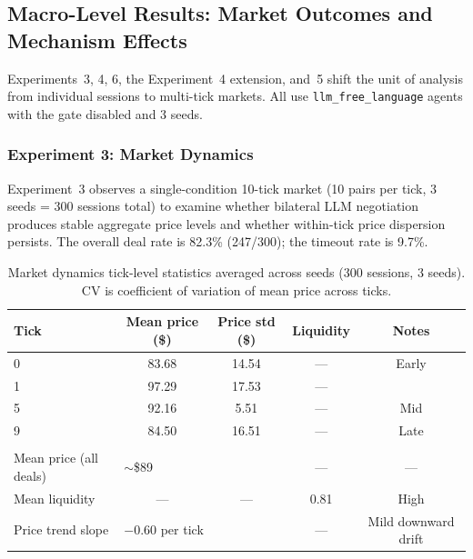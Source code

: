 \subsection{Macro-Level Results: Market Outcomes and Mechanism Effects}
\label{sec:results-macro}

Experiments~3, 4, 6, the Experiment~4 extension, and~5 shift the unit of analysis from individual sessions to multi-tick markets.  All use \texttt{llm\_free\_language} agents with the gate disabled and 3 seeds.

\subsubsection{Experiment 3: Market Dynamics}
\label{sec:results-market}

Experiment~3 observes a single-condition 10-tick market (10 pairs per tick, 3 seeds = 300 sessions total) to examine whether bilateral LLM negotiation produces stable aggregate price levels and whether within-tick price dispersion persists.  The overall deal rate is 82.3\% (247/300); the timeout rate is 9.7\%.

\begin{table}[ht]
\centering
\caption{Market dynamics tick-level statistics averaged across seeds (300 sessions, 3 seeds).  CV is coefficient of variation of mean price across ticks.}
\label{tab:market-agg}
\begin{tabular}{@{}lcccc@{}}
\toprule
Tick & Mean price (\$) & Price std (\$) & Liquidity & Notes \\
\midrule
0 & 83.68 & 14.54 & --- & Early \\
1 & 97.29 & 17.53 & --- & \\
5 & 92.16 & 5.51  & --- & Mid \\
9 & 84.50 & 16.51 & --- & Late \\
\addlinespace
\multicolumn{5}{@{}l}{\textit{Aggregate (all 10 ticks)}} \\
Mean price (all deals) & \multicolumn{2}{l}{$\sim$\$89} & --- & --- \\
Mean liquidity & --- & --- & 0.81 & High \\
Price trend slope & \multicolumn{2}{l}{$-$0.60 per tick} & --- & Mild downward drift \\
\bottomrule
\end{tabular}
\end{table}

